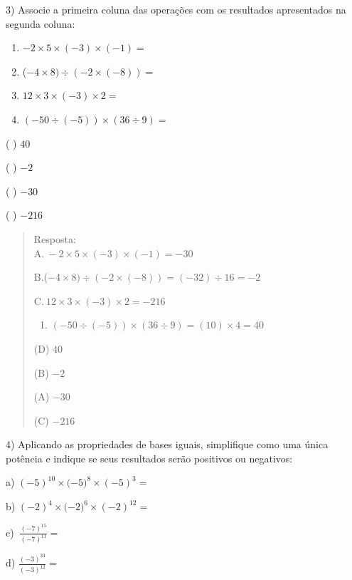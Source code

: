 3) Associe a primeira coluna das operações com os resultados
apresentados na segunda coluna:

\begin{enumerate}
\def\labelenumi{\Alph{enumi}.}
\item
  \(- 2 \times 5 \times \left( - 3 \right) \times \left( - 1 \right) =\)
\item
  (\(- 4 \times 8) \div ( - 2 \times \left( - 8 \right)) =\)
\item
  \(12 \times 3 \times \left( - 3 \right) \times 2 =\)
\item
  \(( - 50 \div \left( - 5 \right)) \times (36 \div 9) =\)
\end{enumerate}

( ) \(40\)

( ) \(- 2\)

( ) \(- 30\)

( ) \(- 216\)

\begin{quote}
Resposta:\\
A.\(\  - 2 \times 5 \times \left( - 3 \right) \times \left( - 1 \right) = - 30\)

B.(\(- 4 \times 8) \div ( - 2 \times \left( - 8 \right)) = \left( - 32 \right) \div 16 = - 2\)

C.\(\ 12 \times 3 \times \left( - 3 \right) \times 2 = - 216\)

\begin{enumerate}
\def\labelenumi{\Alph{enumi}.}
\setcounter{enumi}{3}
\tightlist
\item
  \(\left( - 50 \div \left( - 5 \right) \right) \times \left( 36 \div 9 \right) = \left( 10 \right) \times 4 = 40\)
\end{enumerate}

(D) \(40\)

(B) \(- 2\)

(A) \(- 30\)

(C) \(- 216\)
\end{quote}

4) Aplicando as propriedades de bases iguais, simplifique como uma única
potência e indique se seus resultados serão positivos ou negativos:

a) \({( - 5)}^{10} \times ( - {5)}^{8} \times {( - 5)}^{3} =\)

b) \({( - 2)}^{4} \times ( - {2)}^{6} \times {( - 2)}^{12} =\)

c) \(\ \frac{{( - 7)}^{15}}{{( - 7)}^{11}} =\)

d) \(\frac{{( - 3)}^{33}}{{( - 3)}^{12}} =\)

